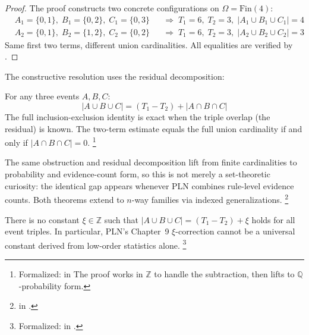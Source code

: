 \documentclass[11pt,openany]{report}
\begin{document}
\begin{proof}[Proof]
The proof constructs two concrete configurations on
$\Omega = \mathrm{Fin}(4)$:
\begin{align*}
  &A_1 = \{0,1\},\; B_1 = \{0,2\},\; C_1 = \{0,3\}
    &&\Longrightarrow\; T_1 = 6,\; T_2 = 3,\; |A_1 \cup B_1 \cup C_1| = 4 \\
  &A_2 = \{0,1\},\; B_2 = \{1,2\},\; C_2 = \{0,2\}
    &&\Longrightarrow\; T_1 = 6,\; T_2 = 3,\; |A_2 \cup B_2 \cup C_2| = 3
\end{align*}
Same first two terms, different union cardinalities.  All equalities
are verified by .
\end{proof}

\noindent
The constructive resolution uses the residual decomposition:

\begin{theorem}
\label{thm:residual-decomp}
For any three events $A, B, C$:
\[
  |A \cup B \cup C| = (T_1 - T_2) + |A \cap B \cap C|
\]
The full inclusion-exclusion identity is exact when the triple
overlap (the residual) is known.  The two-term estimate equals
the full union cardinality if and only if $|A \cap B \cap C| = 0$.%
\footnote{Formalized:
in 
  The proof works in $\mathbb{Z}$ to handle the
subtraction, then lifts to $\mathbb{Q}$-probability form.}
\end{theorem}

\noindent
The same obstruction and residual decomposition lift from finite
cardinalities to probability and evidence-count form, so this is
not merely a set-theoretic curiosity: the identical gap appears
whenever PLN combines rule-level evidence counts.
Both theorems extend to $n$-way families via indexed
generalizations.%
\footnote{
in .}

\begin{corollary}
\label{cor:no-universal-xi}
There is no constant $\xi \in \mathbb{Z}$ such that
$|A \cup B \cup C| = (T_1 - T_2) + \xi$
holds for all event triples.  In particular, PLN's Chapter~9
$\xi$-correction cannot be a universal constant derived from
low-order statistics alone.%
\footnote{Formalized:
in .}
\end{corollary}
\end{document}
